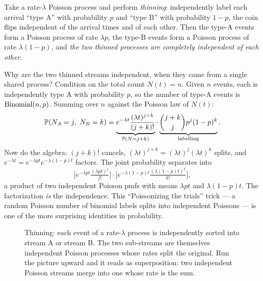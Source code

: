 \begin{theorem}[Thinning]
\label{ch25:thm-thinning}
Take a rate-$\lambda$ Poisson process and perform \emph{thinning}: independently
label each arrival ``type A'' with probability $p$ and ``type B'' with probability
$1-p$, the coin flips independent of the arrival times and of each other. Then
the type-A events form a Poisson process of rate $\lambda p$, the type-B events
form a Poisson process of rate $\lambda(1-p)$, and \emph{the two thinned processes are completely independent of each other}.
\end{theorem}

\begin{whybox}
Why are the two thinned streams independent, when they came from a single shared
process? Condition on the total count $N(t)=n$. Given $n$ events, each is
independently type A with probability $p$, so the number of type-A events is
$\Bin(n,p)$. Summing over $n$ against the Poisson law of $N(t)$:
\[
\P(N_A = j,\ N_B = k)
= \underbrace{e^{-\lambda t}\frac{(\lambda t)^{j+k}}{(j+k)!}}_{\P(N=j+k)}\cdot
\underbrace{\binom{j+k}{j}p^j(1-p)^k}_{\text{labelling}}.
\]
Now do the algebra: $(j+k)!$ cancels, $(\lambda t)^{j+k}=(\lambda t)^j(\lambda
t)^k$ splits, and $e^{-\lambda t}=e^{-\lambda p t}e^{-\lambda(1-p)t}$ factors. The
joint probability separates into
\[
\Big[e^{-\lambda p t}\tfrac{(\lambda p t)^j}{j!}\Big]
\cdot
\Big[e^{-\lambda (1-p) t}\tfrac{(\lambda (1-p) t)^k}{k!}\Big],
\]
a product of two independent Poisson pmfs with means $\lambda p t$ and
$\lambda(1-p)t$. The factorization \emph{is} the independence. This ``Poissonizing
the trials'' trick --- a random Poisson number of binomial labels splits into
independent Poissons --- is one of the more surprising identities in probability.
\end{whybox}

\begin{figure}[H]
\centering
{}
\caption{Thinning: each event of a rate-$\lambda$ process is independently
sorted into stream A or stream B. The two sub-streams are themselves independent
Poisson processes whose rates split the original. Run the picture upward and it
reads as superposition: two independent Poisson streams merge into one whose rate
is the sum.}
\label{ch25:fig-thinning}
\end{figure}

